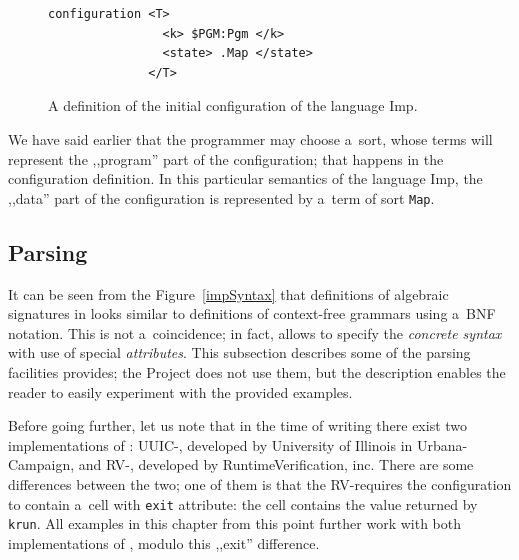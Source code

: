 \documentclass{fithesis3}
\newcommand{\krun}{\texttt{krun}\xspace}
\newcommand{\Project}{Project\xspace}
\begin{document}
\begin{figure}
\begin{lstlisting}
configuration <T>
                <k> $PGM:Pgm </k>
                <state> .Map </state>
              </T>
\end{lstlisting}
\caption{A definition of the initial configuration of the language Imp.}
\label{impConfiguration}
\end{figure}

We have said earlier that the programmer may choose a~sort, whose terms will represent the ,,program'' part of the configuration; that happens in the configuration definition. In this particular semantics of the language Imp, the ,,data'' part of the configuration is represented by a~term of sort \texttt{Map}. %







\subsection{Parsing}
It can be seen from the Figure~\ref{impSyntax} that definitions of algebraic signatures in \K looks similar to definitions of context-free grammars using a~BNF notation. This is not a~coincidence; in fact, \K allows to specify the \textit{concrete syntax} with use of special \textit{attributes}. This subsection describes some of the parsing facilities \K provides; the \Project does not use them, but the description enables the reader to easily experiment with the provided examples.

Before going further, let us note that in the time of writing there exist two implementations of \K: UUIC-\K, developed by University of Illinois in Urbana-Campaign, and RV-\K, developed by RuntimeVerification, inc. There are some differences between the two; one of them is that the RV-\K requires the configuration to contain a~cell with \texttt{exit} attribute: the cell contains the value returned by \krun. All examples in this chapter from this point further work with both implementations of \K, modulo this ,,exit'' difference.
\end{document}
